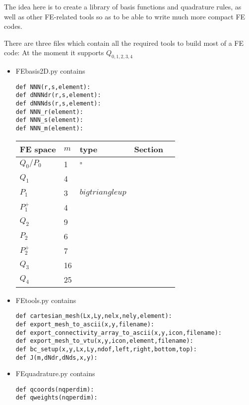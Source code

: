 
The idea here is to create a library of basis functions and quadrature rules, as well as 
other FE-related tools so as to be able to write much more compact FE codes. 

There are three files which contain all the required tools to build most of a FE code:
At the moment it supports $Q_{0,1,2,3,4}$
\begin{itemize}

\item {\pythonfile FEbasis2D.py} contains 
\begin{lstlisting}
def NNN(r,s,element):
def dNNNdr(r,s,element):
def dNNNds(r,s,element):
def NNN_r(element):
def NNN_s(element):
def NNN_m(element):
\end{lstlisting}


\begin{tabular}{lllll}
\hline
FE space  & $m$ & type  & Section  \\
\hline
\hline
$Q_0/P_0$ & 1   & $\square$ & \\
$Q_1$     & 4   &       & \\
$P_1$     & 3   & $bigtriangleup$ & \\
$P_1^+$   & 4   &   &    \\
$Q_2$     & 9   &   &    \\
$P_2$     & 6   &   &    \\
$P_2^+$   & 7   &   &    \\
$Q_3$     & 16  &   &    \\
$Q_4$     & 25  &   &    \\
\hline
\end{tabular}


\item {\pythonfile FEtools.py} contains

\begin{lstlisting}
def cartesian_mesh(Lx,Ly,nelx,nely,element):
def export_mesh_to_ascii(x,y,filename):
def export_connectivity_array_to_ascii(x,y,icon,filename):
def export_mesh_to_vtu(x,y,icon,element,filename):
def bc_setup(x,y,Lx,Ly,ndof,left,right,bottom,top):
def J(m,dNdr,dNds,x,y):
\end{lstlisting}

\item {\pythonfile FEquadrature.py} contains

\begin{lstlisting}
def qcoords(nqperdim):
def qweights(nqperdim):
\end{lstlisting}

\end{itemize}



